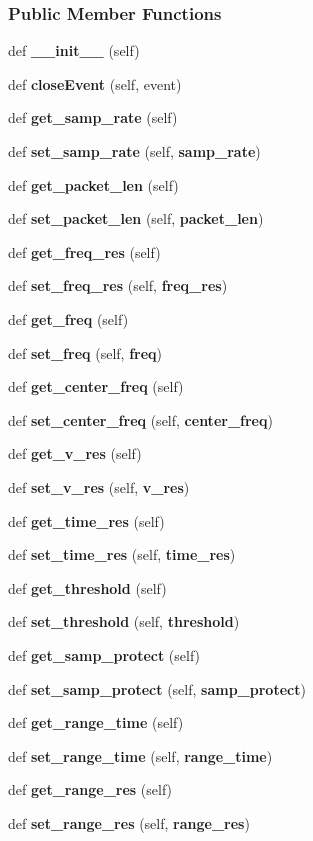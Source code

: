 \subsubsection*{Public Member Functions}
\begin{DoxyCompactItemize}
\item 
def {\bf \+\_\+\+\_\+init\+\_\+\+\_\+} (self)
\item 
def {\bf close\+Event} (self, event)
\item 
def {\bf get\+\_\+samp\+\_\+rate} (self)
\item 
def {\bf set\+\_\+samp\+\_\+rate} (self, {\bf samp\+\_\+rate})
\item 
def {\bf get\+\_\+packet\+\_\+len} (self)
\item 
def {\bf set\+\_\+packet\+\_\+len} (self, {\bf packet\+\_\+len})
\item 
def {\bf get\+\_\+freq\+\_\+res} (self)
\item 
def {\bf set\+\_\+freq\+\_\+res} (self, {\bf freq\+\_\+res})
\item 
def {\bf get\+\_\+freq} (self)
\item 
def {\bf set\+\_\+freq} (self, {\bf freq})
\item 
def {\bf get\+\_\+center\+\_\+freq} (self)
\item 
def {\bf set\+\_\+center\+\_\+freq} (self, {\bf center\+\_\+freq})
\item 
def {\bf get\+\_\+v\+\_\+res} (self)
\item 
def {\bf set\+\_\+v\+\_\+res} (self, {\bf v\+\_\+res})
\item 
def {\bf get\+\_\+time\+\_\+res} (self)
\item 
def {\bf set\+\_\+time\+\_\+res} (self, {\bf time\+\_\+res})
\item 
def {\bf get\+\_\+threshold} (self)
\item 
def {\bf set\+\_\+threshold} (self, {\bf threshold})
\item 
def {\bf get\+\_\+samp\+\_\+protect} (self)
\item 
def {\bf set\+\_\+samp\+\_\+protect} (self, {\bf samp\+\_\+protect})
\item 
def {\bf get\+\_\+range\+\_\+time} (self)
\item 
def {\bf set\+\_\+range\+\_\+time} (self, {\bf range\+\_\+time})
\item 
def {\bf get\+\_\+range\+\_\+res} (self)
\item 
def {\bf set\+\_\+range\+\_\+res} (self, {\bf range\+\_\+res})
\item 

\end{DoxyCompactItemize}
